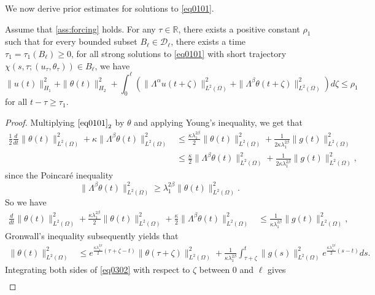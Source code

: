 \documentclass[oneside,preprint,12pt,numbers,sort&compress]{elsarticle}
\begin{document}
We now derive prior estimates for solutions to \cref{eq0101}.
\begin{lemma}\label{lem0301}
Assume that \cref{ass:forcing} holds. For any $\tau \in \mathbb{R}$, there exists a positive constant $\rho_1$ such that for every bounded subset $B_{\ell} \in \mathcal{D}_{\ell}$, there exists a time $\tau_1 =\tau_1(B_{\ell}) \geq 0 $, for all strong solutions to \cref{eq0101} with short trajectory $\chi(s,\tau; (u_\tau, \theta_\tau)) \in B_{\ell}$, we have 
\[
\| u(t) \|_{H_{1}}^{2}
+ \| \theta(t) \|_{H_{2}}^{2}
+ \int_{0}^{\ell} \left(
\| \Lambda^\alpha u(t+\zeta)\|_{L^2(\Omega)}^2 + \| \Lambda^\beta \theta(t+\zeta)\|_{L^2(\Omega)}^2 \right) d\zeta
\leq \rho_1 
\]
for all $t-\tau \geq \tau_1$.
\end{lemma}
\begin{proof}
Multiplying $\eqref{eq0101}_{2}$ by $\theta$ and applying Young's inequality, we get that
\begin{align*}
  \frac{1}{2}\frac{d}{dt}\|\theta(t)\|_{L^2(\Omega)}^2 + \kappa\| \Lambda^\beta \theta(t)\|_{L^2(\Omega)}^2
   & \leq \frac{\kappa\lambda_1^{2\beta}}{2} \|\theta(t)\|_{L^2(\Omega)}^2 + \frac{1}{2\kappa\lambda_1^{2\beta}} \|g(t)\|_{L^2(\Omega)}^2 \\
   & \leq \frac{\kappa}{2} \| \Lambda^\beta \theta(t)\|_{L^2(\Omega)}^2 + \frac{1}{2\kappa\lambda_1^{2\beta}} \|g(t)\|_{L^2(\Omega)}^2,
\end{align*}
since the Poincar\'{e} inequality
$$\| \Lambda^\beta \theta(t)\|_{L^2(\Omega)}^2 \geq \lambda_1^{2\beta}\|\theta(t)\|_{L^2(\Omega)}^2. $$
So we have
\begin{align}\label{eq0301}
  \frac{d}{dt}\|\theta(t)\|_{L^2(\Omega)}^2 + \frac{\kappa\lambda_1^{2\beta}}{2} \|\theta(t)\|_{L^2(\Omega)}^2 + \frac{\kappa}{2}\| \Lambda^\beta \theta(t)\|_{L^2(\Omega)}^2 
   & \leq \frac{1}{\kappa\lambda_1^{2\beta}} \|g(t)\|_{L^2(\Omega)}^2,
\end{align}
Gronwall's inequality subsequently yields that
\begin{align}\label{eq0302} 
  \|\theta(t)\|_{L^2(\Omega)}^2
   & \leq e^{\frac{\kappa\lambda_{1}^{2\beta}}{2}(\tau+\zeta-t)} \|\theta(\tau+\zeta)\|_{L^2(\Omega)}^2 + \frac{1}{\kappa\lambda_{1}^{2\beta}} \int_{\tau+\zeta}^{t} \|g(s)\|_{L^2(\Omega)}^2 e^{\frac{\kappa\lambda_{1}^{2\beta}}{2}(s-t)} ds.
\end{align}
Integrating both sides of \cref{eq0302} with respect to $\zeta$ between $0$ and $\ell$ gives 
\begin{equation}\label{eq0303}
\begin{aligned}

\end{aligned}
\end{equation}
\end{proof}
\end{document}
